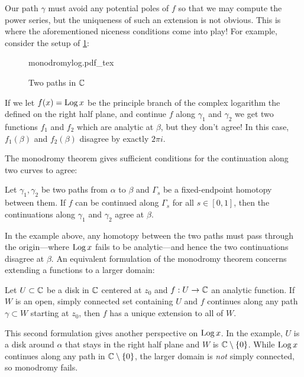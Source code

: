 Our path \(\gamma\) must avoid any potential poles of \(f\) so that we may
compute the power series, but the uniqueness of such an extension is not
obvious. This is where the aforementioned niceness conditions come into play!
For example, consider the setup of \cref{fig:monolog}:

\begin{figure}[h!]%
\centering
  \def\svgwidth{0.52\columnwidth}
  {monodromylog.pdf_tex}
\caption{Two paths in \(\mathbb{C} \)}
\label{fig:monolog}
\end{figure}

\begin{example}%
\label{ex:logmono}
If we let \(f(x)=\operatorname{Log} x\) be the principle branch of the complex logarithm the
defined on the right half plane, and continue \(f\) along \(\gamma_1\) and
\(\gamma_2\) we get two functions \(f_1\) and \(f_2\) which are analytic at
\(\beta\), but they don't agree! In this case, \(f_1(\beta)\) and \(f_2(\beta)\)
disagree by exactly \(2\pi i\).
\end{example}

The monodromy theorem gives sufficient conditions for the continuation along
two curves to agree:

\begin{theorem}[Monodromy I]%
\label{thm:mon1}
  Let \(\gamma_1, \gamma_2\) be two paths from \(\alpha\) to \(\beta\) and
  \(\Gamma_s\) be a fixed-endpoint homotopy between them. If \(f\) can be
  continued along \(\Gamma_s\) for all \(s \in [0,1]\), then the continuations
  along \(\gamma_1\) and \(\gamma_2\) agree at \(\beta\).
\end{theorem}

In the example above, any homotopy between the two paths must pass through the
origin---where \(\operatorname{Log} x\) fails to be analytic---and hence the two continuations
disagree at \(\beta\).
An equivalent formulation of the monodromy theorem concerns extending a
functions to a larger domain:

\begin{theorem}[Monodromy II]%
\label{thm:mon2}
  Let \(U \subset \mathbb{C} \) be a disk in \(\mathbb{C} \) centered at \(z_0\) and
  \(f: U \to \mathbb{C} \) an analytic function. If \(W\) is
  an open, simply connected set containing \(U\) and \(f\) continues along any
  path \(\gamma \subset W\) starting at \(z_0\), then \(f\) has a unique
  extension to all of \(W\).
\end{theorem}

This second formulation gives another perspective on \(\operatorname{Log} x\). In the example,
\(U\) is a disk around \(\alpha\) that stays in the right half plane and \(W\)
is \(\mathbb{C} \setminus \{0\} \). While \(\operatorname{Log} x\) continues along any path in
\(\mathbb{C}  \setminus \{0\} \), the larger domain is \emph{not} simply connected, so
monodromy fails.


